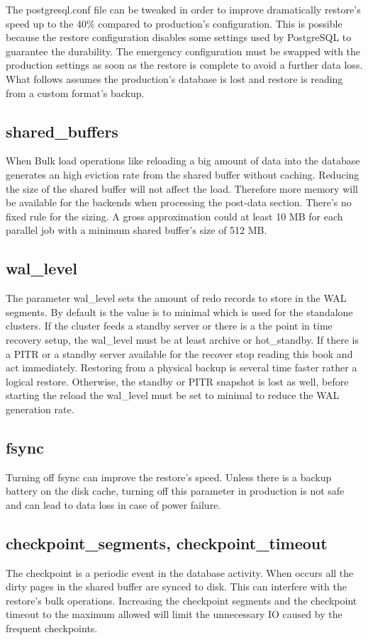 The postgresql.conf file can be tweaked in order to improve dramatically restore's speed up to the 40\% 
compared to production's configuration. This is possible because the restore configuration disables some 
settings used by PostgreSQL to guarantee the durability. The emergency configuration must be swapped with 
the production settings as soon as the restore is complete to avoid a further data loss. What follows 
assumes the production's database is lost and restore is reading from a custom format's backup. 

\subsection{shared\_buffers}
When Bulk load operations like reloading a big amount of data into the database generates an high eviction 
rate from the shared buffer without caching. Reducing the size of the shared buffer will not affect the 
load. Therefore more memory will be available for the backends when processing the post-data section. 
There's no fixed rule for the sizing. A gross approximation could at least 10 MB for each parallel job 
with a minimum shared buffer's size of 512 MB.   

\subsection{wal\_level}
The parameter wal\_level sets the amount of redo records to store in the WAL segments. 
By default is the value is to minimal which is used for the standalone clusters. If the cluster feeds a 
standby server or there is a the point in time recovery setup, the wal\_level must be at least archive 
or hot\_standby. If there is a PITR or a standby server available for the recover stop reading this book 
and act immediately. Restoring from a physical backup is several time faster rather a logical restore. 
Otherwise, the standby or PITR snapshot is lost as well, before starting the reload the wal\_level must be 
set to minimal to reduce the WAL generation rate.

\subsection{fsync}
Turning off fsync can improve the restore's speed. Unless there is a backup battery on the disk 
cache, turning off this parameter in production is not safe and can lead to data loss in case of power
failure. 

\subsection{checkpoint\_segments, checkpoint\_timeout}
The checkpoint is a periodic event in the database activity. When occurs all the dirty pages in the 
shared buffer are synced to disk. This can interfere with the restore's bulk operations. Increasing the
checkpoint segments and the checkpoint timeout to the maximum allowed will limit the unnecessary IO caused 
by the frequent checkpoints.



